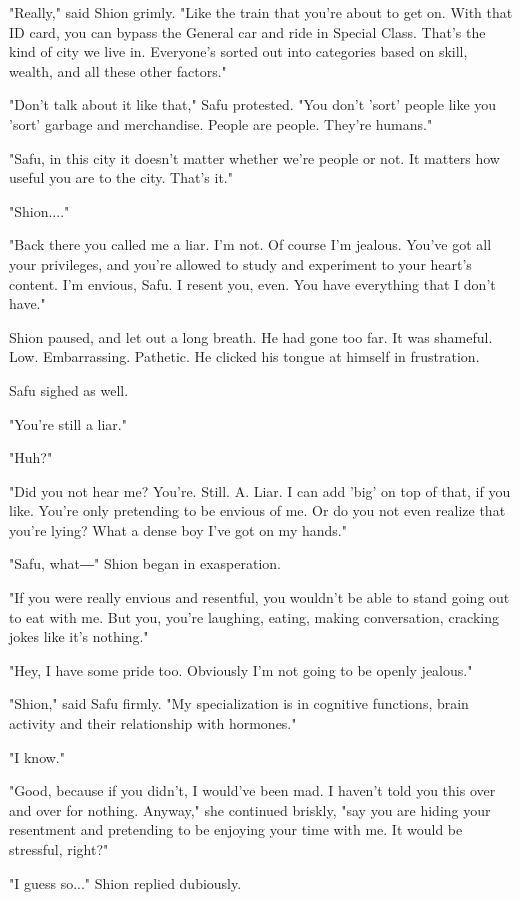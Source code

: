 "Really," said Shion grimly. "Like the train that you're about to get
on. With that ID card, you can bypass the General car and ride in
Special Class. That's the kind of city we live in. Everyone's sorted out
into categories based on skill, wealth, and all these other factors."

"Don't talk about it like that," Safu protested. "You don't 'sort'
people like you 'sort' garbage and merchandise. People are people.
They're humans."

"Safu, in this city it doesn't matter whether we're people or not. It
matters how useful you are to the city. That's it."

"Shion...."

"Back there you called me a liar. I'm not. Of course I'm jealous. You've
got all your privileges, and you're allowed to study and experiment to
your heart's content. I'm envious, Safu. I resent you, even. You have
everything that I don't have."

Shion paused, and let out a long breath. He had gone too far. It was
shameful. Low. Embarrassing. Pathetic. He clicked his tongue at himself
in frustration.

Safu sighed as well.

"You're still a liar."

"Huh?"

"Did you not hear me? You're. Still. A. Liar. I can add 'big' on top of
that, if you like. You're only pretending to be envious of me. Or do you
not even realize that you're lying? What a dense boy I've got on my
hands."

"Safu, what―" Shion began in exasperation.

"If you were really envious and resentful, you wouldn't be able to stand
going out to eat with me. But you, you're laughing, eating, making
conversation, cracking jokes like it's nothing."

"Hey, I have some pride too. Obviously I'm not going to be openly
jealous."

"Shion," said Safu firmly. "My specialization is in cognitive functions,
brain activity and their relationship with hormones."

"I know."

"Good, because if you didn't, I would've been mad. I haven't told you
this over and over for nothing. Anyway," she continued briskly, "say you
are hiding your resentment and pretending to be enjoying your time with
me. It would be stressful, right?"

"I guess so..." Shion replied dubiously.

